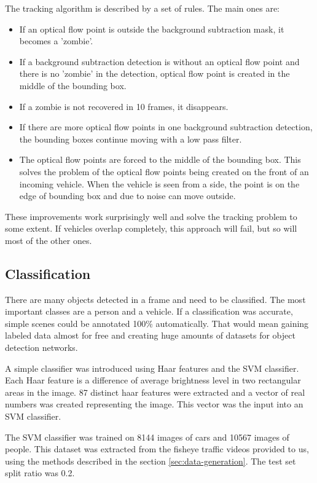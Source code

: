 \documentclass[a4paper,11pt,titlepage,twoside]{article}
\numberwithin{figure}{section}
\begin{document}
The tracking algorithm is described by a set of rules. The main ones are:
\begin{itemize}
    \item If an optical flow point is outside the background subtraction mask, it becomes a 'zombie'.
    \item If a background subtraction detection is without an optical flow point and there is no 'zombie' in the detection, optical flow point is created in the middle of the bounding box. 
    \item If a zombie is not recovered in 10 frames, it disappears. 
    \item If there are more optical flow points in one background subtraction detection, the bounding boxes continue moving with a low pass filter.
    \item The optical flow points are forced to the middle of the bounding box. This solves the problem of the optical flow points being created on the front of an incoming vehicle. When the vehicle is seen from a side, the point is on the edge of bounding box and due to noise can move outside. 
\end{itemize}

These improvements work surprisingly well and solve the tracking problem to some extent. If vehicles overlap completely, this approach will fail, but so will most of the other ones. 

\subsection{Classification}
There are many objects detected in a frame and need to be classified. The most important classes are a person and a vehicle. If a classification was accurate, simple scenes could be annotated 100\% automatically. That would mean gaining labeled data almost for free and creating huge amounts of datasets for object detection networks.

A simple classifier was introduced using Haar features \cite{haar} and the SVM classifier. Each Haar feature is a difference of average brightness level in two rectangular areas in the image. 87 distinct haar features were extracted and a vector of real numbers was created representing the image. This vector was the input into an SVM classifier.

The SVM classifier was trained on 8144 images of cars and 10567 images of people. This dataset was extracted from the fisheye traffic videos provided to us, using the methods described in the section \ref{sec:data-generation}. The test set split ratio was 0.2.
\end{document}
